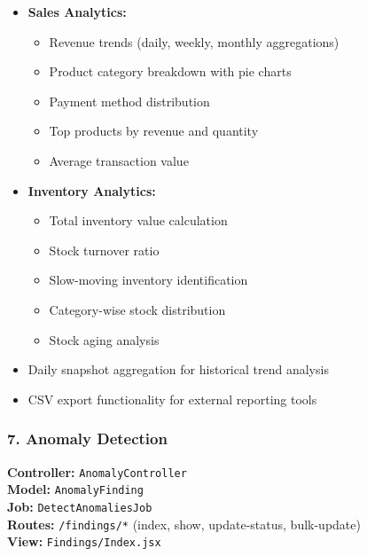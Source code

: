 \begin{itemize}
    \item \textbf{Sales Analytics:}
    \begin{itemize}
        \item Revenue trends (daily, weekly, monthly aggregations)
        \item Product category breakdown with pie charts
        \item Payment method distribution
        \item Top products by revenue and quantity
        \item Average transaction value
    \end{itemize}
    \item \textbf{Inventory Analytics:}
    \begin{itemize}
        \item Total inventory value calculation
        \item Stock turnover ratio
        \item Slow-moving inventory identification
        \item Category-wise stock distribution
        \item Stock aging analysis
    \end{itemize}
    \item Daily snapshot aggregation for historical trend analysis
    \item CSV export functionality for external reporting tools
\end{itemize}

\subsubsection{7. Anomaly Detection}

\textbf{Controller:} \texttt{AnomalyController}\\
\textbf{Model:} \texttt{AnomalyFinding}\\
\textbf{Job:} \texttt{DetectAnomaliesJob}\\
\textbf{Routes:} \texttt{/findings/*} (index, show, update-status, bulk-update)\\
\textbf{View:} \texttt{Findings/Index.jsx}

